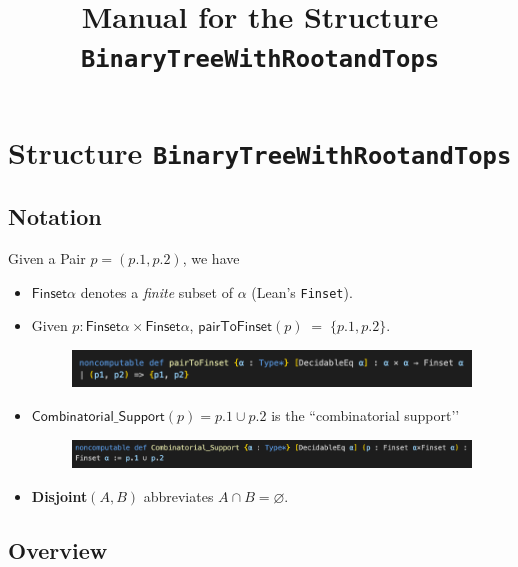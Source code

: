 \documentclass[11pt]{amsart}
\title{Manual for the Structure \texttt{BinaryTreeWithRootandTops}}
\author{}
\date{}
\theoremstyle{remark}            %
\newcommand{\pairToFinset}{\mathsf{pairToFinset}}
\newcommand{\supp}{\mathsf{Combinatorial\_Support}}
\newcommand{\Fin}{\mathsf{Finset}}
\begin{document}
\maketitle

 

\section{Structure \texttt{BinaryTreeWithRootandTops}}


\subsection{Notation}
Given a Pair $p=(p.1,p.2)$, we have 
\begin{itemize}[leftmargin=1.5em]
  \item $\Fin\alpha$ denotes a \emph{finite} subset of $\alpha$ (Lean’s \texttt{Finset}).
  \item Given $p : \Fin\alpha\times\Fin\alpha$,  
        $\pairToFinset(p) \;=\; \{ p.1, p.2\}$.
        \begin{figure}[h]             %
  \centering                     %
  \includegraphics[width=0.99\linewidth]{pairfinset.png} %
\end{figure}
  \item $\supp(p)= p.1\cup p.2$ is the “combinatorial support’’  
       \begin{figure}[h]             %
  \centering                     %
  \includegraphics[width=0.99\linewidth]{combsup.png} %
\end{figure}
  \item \textbf{Disjoint}$(A,B)$ abbreviates $A\cap B=\varnothing$.
\end{itemize}

\subsection{Overview}
\end{document}

